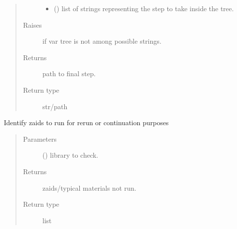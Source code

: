 \documentclass[letterpaper,10pt,english]{sphinxmanual}
\begin{document}
\begin{fulllineitems}
\begin{fulllineitems}
\begin{quote}
\begin{description}
\begin{itemize}
\item {} 
 () \textendash{} list of strings representing the step to take inside the tree.

\end{itemize}

\item[{Raises}] \leavevmode
{} \textendash{} if var tree is not among possible strings.

\item[{Returns}] \leavevmode
{} \textendash{} path to final step.

\item[{Return type}] \leavevmode
str/path

\end{description}\end{quote}

\end{fulllineitems}


\begin{fulllineitems}
\label{\detokenize{api/initobjects:status.Status.get_unfinished_zaids}}
Identify zaids to run for rerun or continuation purposes
\begin{quote}\begin{description}
\item[{Parameters}] \leavevmode
{} () \textendash{} library to check.

\item[{Returns}] \leavevmode
{} \textendash{} zaids/typical materials not run.

\item[{Return type}] \leavevmode
list

\end{description}\end{quote}

\end{fulllineitems}



\end{fulllineitems}
\end{document}
